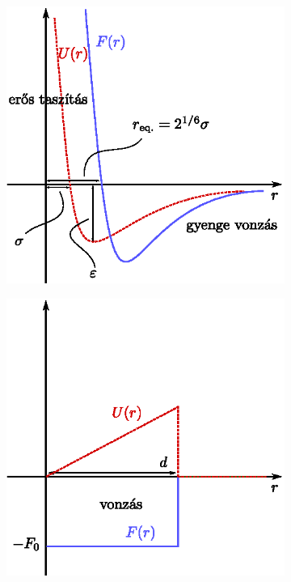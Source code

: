 \begin{figure}[htb]
    \centering
    \begin{subfigure}[t]{0.45\textwidth}
            \centering
            \includegraphics[width=\textwidth]{termo_4/termo_4_4}
            \label{fig:termo_4_4}
    \end{subfigure}\hfill
    \begin{subfigure}[t]{0.45\textwidth}
            \centering
            \includegraphics[width=\textwidth]{termo_4/termo_4_5}
            \label{fig:termo_4_5}
    \end{subfigure}
\end{figure}
